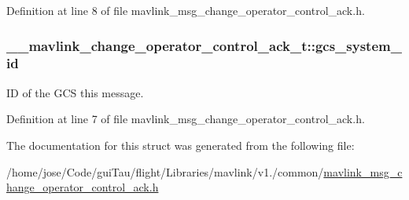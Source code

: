 Definition at line 8 of file mavlink\-\_\-msg\-\_\-change\-\_\-operator\-\_\-control\-\_\-ack.\-h.

\hypertarget{struct____mavlink__change__operator__control__ack__t_adb8f2a279063a0615952eda9f2b3dc24}{
\subsubsection[{gcs\-\_\-system\-\_\-id}]{ \-\_\-\-\_\-mavlink\-\_\-change\-\_\-operator\-\_\-control\-\_\-ack\-\_\-t\-::gcs\-\_\-system\-\_\-id}}\label{struct____mavlink__change__operator__control__ack__t_adb8f2a279063a0615952eda9f2b3dc24}


I\-D of the G\-C\-S this message. 



Definition at line 7 of file mavlink\-\_\-msg\-\_\-change\-\_\-operator\-\_\-control\-\_\-ack.\-h.



The documentation for this struct was generated from the following file\-:\begin{DoxyCompactItemize}
\item 
/home/jose/\-Code/gui\-Tau/flight/\-Libraries/mavlink/v1./common/\hyperlink{mavlink__msg__change__operator__control__ack_8h}{mavlink\-\_\-msg\-\_\-change\-\_\-operator\-\_\-control\-\_\-ack.\-h}\end{DoxyCompactItemize}
